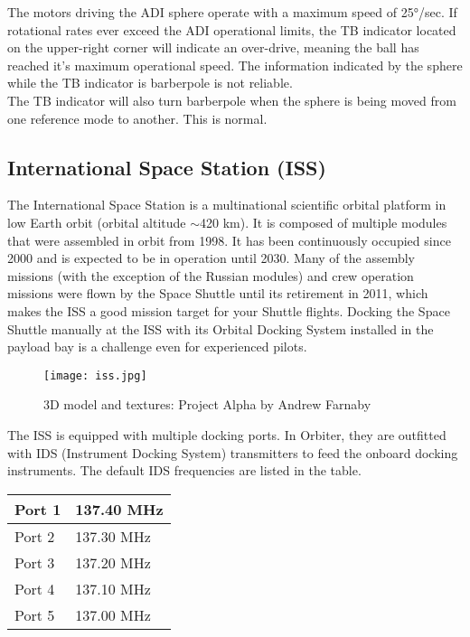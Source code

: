 \documentclass[Orbiter User Manual.tex]{subfiles}
\begin{document}
\noindent
The motors driving the ADI sphere operate with a maximum speed of 25°/sec. If rotational rates ever exceed the ADI operational limits, the TB indicator located on the upper-right corner will indicate an over-drive, meaning the ball has reached it's maximum operational speed. The information indicated by the sphere while the TB indicator is barberpole is not reliable.\\
The TB indicator will also turn barberpole when the sphere is being moved from one reference mode to another. This is normal.





\subsection{International Space Station (ISS)}
The International Space Station is a multinational scientific orbital platform in low Earth orbit (orbital altitude $\sim$420 km). It is composed of multiple modules that were assembled in orbit from 1998. It has been continuously occupied since 2000 and is expected to be in operation until 2030. Many of the assembly missions (with the exception of the Russian modules) and crew operation missions were flown by the Space Shuttle until its retirement in 2011, which makes the ISS a good mission target for your Shuttle flights. Docking the Space Shuttle manually at the ISS with its Orbital Docking System installed in the payload bay is a challenge even for experienced pilots.

\begin{figure}[H]
  \centering
  \texttt{[image: iss.jpg]}
  \caption{3D model and textures: Project Alpha by Andrew Farnaby}
\end{figure}

\noindent
The ISS is equipped with multiple docking ports. In Orbiter, they are outfitted with IDS (Instrument Docking System) transmitters to feed the onboard docking instruments. The default IDS frequencies are listed in the table.

	\begin{longtable}{ |p{}|p{}| }
	\hline\rule{0pt}{2ex}
	Port 1 & 137.40  MHz\\
	\hline\rule{0pt}{2ex}
	Port 2 & 137.30  MHz\\
	\hline\rule{0pt}{2ex}
	Port 3 & 137.20  MHz\\
	\hline\rule{0pt}{2ex}
	Port 4 & 137.10  MHz\\
	\hline\rule{0pt}{2ex}
	Port 5 & 137.00  MHz\\
	\hline
	\end{longtable}
\end{document}
